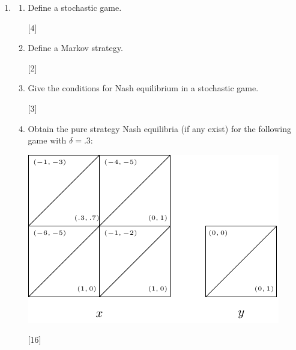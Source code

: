 \documentclass[12pt,a4paper]{article}
\makeatletter
\renewcommand{\@oddfoot}{\hfil \arabic{page} \hfil}    %
\makeatother
\begin{document}
\begin{enumerate}
\begin{enumerate}
        ~\hfill[12]

    \end{enumerate}

\newpage
\item

    \begin{enumerate}

        \item Define a stochastic game.

        \hfill[4]

        \item Define a Markov strategy.

        \hfill[2]

        \item Give the conditions for Nash equilibrium in a stochastic game.

        \hfill[3]

        \item Obtain the pure strategy Nash equilibria (if any exist) for the
            following game with \(\delta=.3\):

        \begin{center}
            \includegraphics[width=.8\textwidth]{images/2014-2015-resit-img01.pdf}
        \end{center}

        \hfill[16]

    \end{enumerate}

\end{enumerate}

\makeatletter
\renewcommand{\@oddfoot}{\hfil \arabic{page}X \hfil}    %
\makeatother
\end{document}

